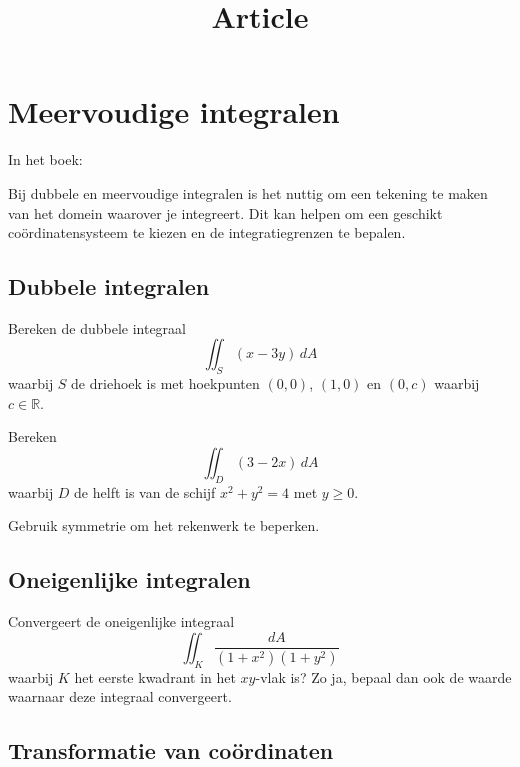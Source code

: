 \documentclass[
    10pt,
    a4paper,
    twoside,
]{article}
\title{Article}
\begin{document}
\maketitle

\section{Meervoudige integralen}

In het boek:~\cite[H15.1 - H15.6]{cursus}

\begin{hint}{}
    Bij dubbele en meervoudige integralen is het nuttig om een tekening te maken van het domein waarover je integreert.
    Dit kan helpen om een geschikt coördinatensysteem te kiezen en de integratiegrenzen te bepalen.
\end{hint}


\subsection*{Dubbele integralen}

\begin{oefening}{}{}
    Bereken de dubbele integraal
    \[
        \iint_S (x-3y)\,dA
    \] waarbij $S$ de driehoek is met hoekpunten $(0,0)$, $(1,0)$ en $(0,c)$ waarbij $c \in \mathbb{R}$.
\end{oefening}

\begin{oefening}{}{}
    Bereken
    \[
        \iint_D (3-2x)\, dA
    \] waarbij $D$ de helft is van de schijf $x^2 + y^2 = 4$ met $y \geq 0$.
    \begin{hint}{}
        Gebruik symmetrie om het rekenwerk te beperken.
    \end{hint}
\end{oefening}


\subsection*{Oneigenlijke integralen}

\begin{oefening}{}{}
    Convergeert de oneigenlijke integraal
    \[
        \iint_K \frac{dA}{(1+x^2)(1+y^2)}
    \] waarbij $K$ het eerste kwadrant in het $xy$-vlak is?
    Zo ja, bepaal dan ook de waarde waarnaar deze integraal convergeert.
\end{oefening}


\subsection*{Transformatie van coördinaten}
\end{document}
